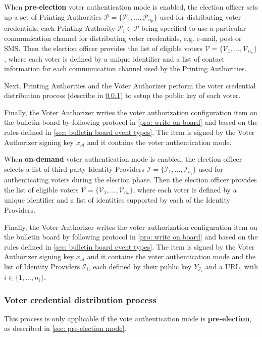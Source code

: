 When \textbf{pre-election} voter authentication mode is enabled, the election officer sets up a set of Printing Authorities $\boldsymbol{\mathcal{P}} = \{ \mathcal{P}_1, ..., \mathcal{P}_{n_\mathrm{p}} \}$ used for distributing voter credentials, each Printing Authority $\mathcal{P}_i \in \boldsymbol{\mathcal{P}}$ being specified to use a particular communication channel for distributing voter credentials, e.g. e-mail, post or SMS. Then the election officer provides the list of eligible voters $\boldsymbol{\mathcal{V}} = \{ \mathcal{V}_1, ..., \mathcal{V}_{n_\mathrm{v}} \}$, where each voter is defined by a unique identifier and a list of contact information for each communication channel used by the Printing Authorities.

Next, Printing Authorities and the Voter Authorizer perform the voter credential distribution process (describe in \cref{sec: voter credential distribution process}) to setup the public key of each voter.

Finally, the Voter Authorizer writes the voter authorization configuration item on the bulletin board by following protocol in \cref{pro: write on board} and based on the rules defined in \cref{sec: bulletin board event types}. The item is signed by the Voter Authorizer signing key $x_\mathcal{A}$ and it contains the voter authentication mode.

When \textbf{on-demand} voter authentication mode is enabled, the election officer selects a list of third party Identity Providers $\boldsymbol{\mathcal{I}} = \{ \mathcal{I}_1, ..., \mathcal{I}_{n_\mathrm{i}} \}$ used for authenticating voters during the election phase. Then the election officer provides the list of eligible voters $\boldsymbol{\mathcal{V}} = \{ \mathcal{V}_1, ..., \mathcal{V}_{n_\mathrm{v}} \}$, where each voter is defined by a unique identifier and a list of identities supported by each of the Identity Providers.

Finally, the Voter Authorizer writes the voter authorization configuration item on the bulletin board by following protocol in \cref{pro: write on board} and based on the rules defined in \cref{sec: bulletin board event types}. The item is signed by the Voter Authorizer signing key $x_\mathcal{A}$ and it contains the voter authentication mode and the list of Identity Providers $\mathcal{I}_i$, each defined by their public key $Y_{\mathcal{I}_i}$ and a URL, with $i \in \{ 1, ..., n_\mathrm{i} \}$.


\subsubsection{Voter credential distribution process} \label{sec: voter credential distribution process}
This process is only applicable if the vote authentication mode is \textbf{pre-election}, as described in \cref{sec: pre-election mode}.

